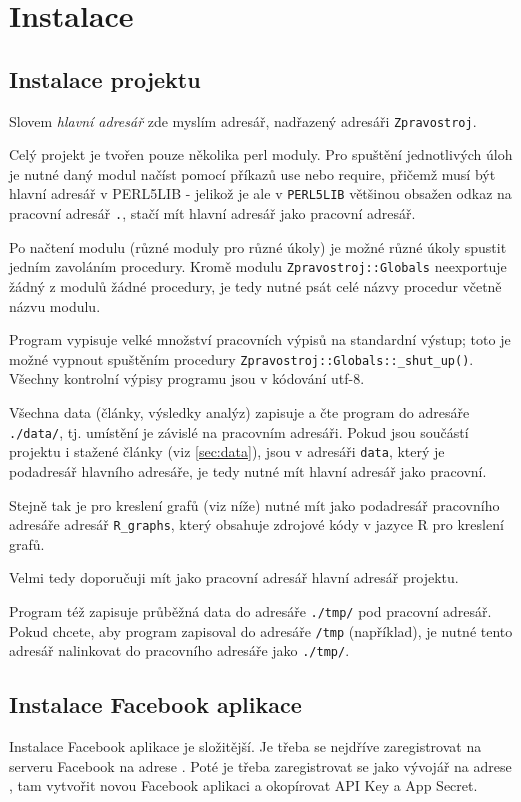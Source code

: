 \documentclass[12pt,a4paper]{report}
\begin{document}
\chapter{Instalace}

\section{Instalace projektu}

Slovem \emph{hlavní adresář} zde myslím adresář, nadřazený adresáři \texttt{Zpravostroj}.

Celý projekt je tvořen pouze několika perl moduly. Pro spuštění jednotlivých úloh je nutné daný modul načíst pomocí příkazů use nebo require, přičemž musí být hlavní adresář v PERL5LIB - jelikož je ale v \texttt{PERL5LIB} většinou obsažen odkaz na pracovní adresář \texttt{.}, stačí mít hlavní adresář jako pracovní adresář.

Po načtení modulu (různé moduly pro různé úkoly) je možné různé úkoly spustit jedním zavoláním procedury. Kromě modulu \texttt{Zpravostroj::Globals} neexportuje žádný z modulů žádné procedury, je tedy nutné psát celé názvy procedur včetně názvu modulu.

Program vypisuje velké množství pracovních výpisů na standardní výstup; toto je možné vypnout spuštěním procedury \texttt{Zpravostroj::Globals::\_shut\_up()}. Všechny kontrolní výpisy programu jsou v kódování utf-8.

Všechna data (články, výsledky analýz) zapisuje a čte program do adresáře \texttt{./data/}, tj. umístění je závislé na pracovním adresáři. Pokud jsou součástí projektu i stažené články (viz \ref{sec:data}), jsou v adresáři \texttt{data}, který je podadresář hlavního adresáře, je tedy nutné mít hlavní adresář jako pracovní.

Stejně tak je pro kreslení grafů (viz níže) nutné mít jako podadresář pracovního adresáře adresář \texttt{R\_graphs}, který obsahuje zdrojové kódy v jazyce R pro kreslení grafů.

Velmi tedy doporučuji mít jako pracovní adresář hlavní adresář projektu.

Program též zapisuje průběžná data do adresáře \texttt{./tmp/} pod pracovní adresář. Pokud chcete, aby program zapisoval do adresáře \texttt{/tmp} (například), je nutné tento adresář nalinkovat do pracovního adresáře jako \texttt{./tmp/}.

\section{Instalace Facebook aplikace}
Instalace Facebook aplikace je složitější. Je třeba se nejdříve zaregistrovat na serveru Facebook na adrese . Poté je třeba zaregistrovat se jako vývojář na adrese , tam vytvořit novou Facebook aplikaci a okopírovat API Key a App Secret.
\end{document}
